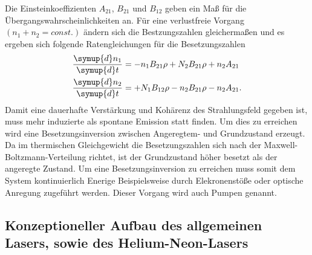 Die Einsteinkoeffizienten $A_21$, $B_21$ und $B_12$
geben ein Maß für die Übergangswahrscheinlichkeiten an.
Für eine verlustfreie Vorgang
$(n_1+n_2=const.)$ ändern sich die Bestzungszahlen
gleichermaßen und es ergeben sich folgende
Ratengleichungen für die Besetzungszahlen
\begin{align}
\frac{\symup{d} n_1}{\symup{d} t} &=-n_1 B_{21}\rho + N_2 B_{21} \rho + n_2 A_{21}\\
\frac{\symup{d} n_2}{\symup{d} t} &=+N_1 B_{12}\rho - n_2 B_{21} \rho - n_2 A_{21}.
\end{align}
Damit eine dauerhafte Verstärkung
und Kohärenz des Strahlungsfeld gegeben ist,
muss mehr induzierte als spontane Emission
statt finden. Um dies zu
erreichen wird eine Besetzungsinversion
zwischen Angeregtem- und Grundzustand
erzeugt.
Da im thermischen Gleichgewicht
die Besetzungszahlen sich nach der
Maxwell-Boltzmann-Verteilung
richtet, ist der Grundzustand höher
besetzt als der angeregte Zustand.
Um eine Besetzungsinversion zu erreichen
muss somit dem System kontinuierlich
Enerige Beispielsweise durch
Elekronenstöße oder
optische Anregung zugeführt werden.
Dieser Vorgang wird auch Pumpen genannt.



\subsection{Konzeptioneller Aufbau des allgemeinen Lasers,
sowie des Helium-Neon-Lasers}
\label{subsec:konzeptioneller_aufbau}

